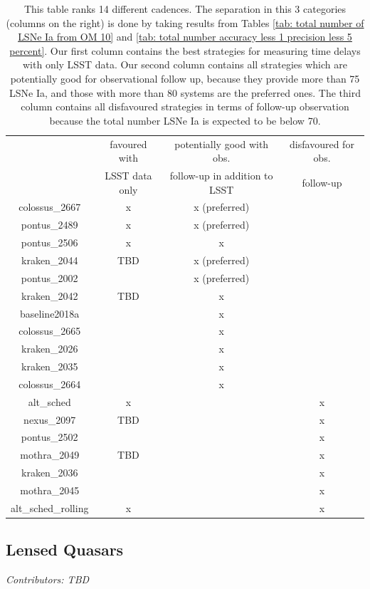 \begin{table}
\centering
\begin{tabular}{c|c|c|c}
& favoured with  & potentially good with obs. & disfavoured for  obs. \\
& LSST data only &  follow-up in addition to LSST & follow-up\\
\hline
colossus\_2667 & x & x (preferred) & \\
\hline
pontus\_2489 & x & x (preferred) & \\
\hline
pontus\_2506 & x & x \\
\hline
kraken\_2044 & TBD & x (preferred) & \\
\hline
pontus\_2002 & & x (preferred) &   \\
\hline
kraken\_2042 & TBD & x & \\
\hline
baseline2018a & & x &    \\
\hline
colossus\_2665 & & x &   \\
\hline
kraken\_2026 & & x & \\
\hline
kraken\_2035 & & x &    \\
\hline
colossus\_2664 & & x &   \\
\hline
alt\_sched & x  & & x \\
\hline
nexus\_2097 & TBD  & & x  \\
\hline
pontus\_2502 &&  &x  \\
\hline
mothra\_2049 & TBD & & x  \\
\hline
kraken\_2036 & & & x  \\
\hline
mothra\_2045 & & & x  \\
\hline
alt\_sched\_rolling & x & & x  \\
\end{tabular}
\caption{This table ranks 14 different cadences. The separation in
  this 3 categories (columns on the right) is done by taking results
  from Tables \ref{tab: total number of LSNe Ia from OM 10} and
  \ref{tab: total number accuracy less 1 precision less 5
    percent}. Our first column contains the best strategies for
  measuring time delays with only LSST data. Our second column
  contains all strategies which are potentially good for observational
  follow up, because they provide more than 75 LSNe Ia, and those with
  more than 80 systems are the preferred ones. The third column
  contains all disfavoured strategies in terms of follow-up
  observation because the total number LSNe Ia is expected to be below 70. }
\label{tab: favoured strategies}
\end{table}


\pagebreak

\subsection{Lensed Quasars}
\textit{Contributors: TBD}

